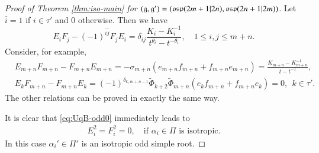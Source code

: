 \documentclass[12pt]{amsart}
\theoremstyle{definition}
\theoremstyle{remark}
\numberwithin{equation}{section}
\begin{document}
\begin{proof}[Proof of Theorem \ref{thm:iso-main} for $({{\mathfrak g}}, {{\mathfrak g}}')=({{\rm\mathfrak{osp}}}(2m+1|2n), {{\rm\mathfrak{osp}}}(2n+1|2m))$]
Let $\bar{i}=1$ if $i\in\tau'$ and $0$ otherwise. Then we have 
\begin{equation}\label{eq:EF-t}
E_i F_j - (-1)^{\bar{i}\bar{j}}F_j E_i
    =\delta_{i j} \frac{K_i -K_i^{-1}}{t ^{\theta_i}- t^{-\theta_i}}, \quad 1\le i, j\le m+n.
\end{equation}
Consider, for example, 
\[\begin{aligned}
&E_{m+n}F_{m+n}\!\!-\!\!F_{m+n}E_{m+n}=-\sigma_{m+n}(e_{m+n}f_{m+n}\!+\!f_{m+n}e_{m+n})=\!\!\frac{K_{m+n}\!-\!K_{m+n}^{-1}}{t\!-\!t^{-1}}, \\
&E_kF_{m+n}-F_{m+n}E_k=(-1)^{\delta_{k,m+n-1}}\tilde{\Phi}_{k+2}\tilde{\Phi}_{m+n}(e_kf_{m+n}+f_{m+n}e_k)=0, \ \ k\in\tau'.
\end{aligned}\]
The other relations can be proved in exactly the same way. 

It is clear that \eqref{eq:UqB-odd0} immediately leads to 
\begin{eqnarray} \label{eq:nilpotent-t}
E_i^2=F_i^2=0, \quad \text{if $\alpha_i\in\Pi$ is isotropic}.
\end{eqnarray}
In this case $\alpha_i'\in \Pi'$ is an isotropic odd simple root.


\end{proof}
\end{document}
